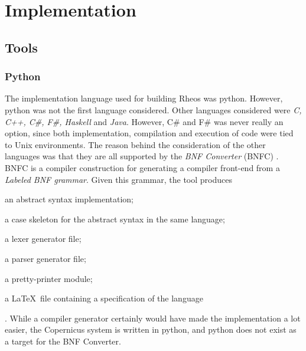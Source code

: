 \chapter{Implementation}\label{chap:implementation}


%
%
%

\section{Tools}

\subsection{Python}
The implementation language used for building Rheos was
python. However, python was not the first language considered. Other
languages considered were \emph{C, C++, C\#, F\#, Haskell} and
\emph{Java}. However, C\# and F\# was never really an option, since
both implementation, compilation and execution of code were tied to
Unix environments. The reason behind the consideration of the other
languages was that they are all supported by the \emph{BNF Converter}
(BNFC) \citep{bnfc:online}. BNFC is a compiler construction for
generating a compiler front-end from a \emph{Labeled BNF
  grammar}. Given this grammar, the tool produces
\begin{inparaenum}[(1)]
\item an abstract syntax implementation;
\item a case skeleton for the abstract syntax in the same language;
\item a lexer generator file;
\item a parser generator file;
\item a pretty-printer module;
\item a \LaTeX~file containing a specification of the language
\end{inparaenum} \citep{bnfc:online}.
While a compiler generator certainly would have made the
implementation a lot easier, the Copernicus system is written in
python, and python does not exist as a target for the BNF Converter.

